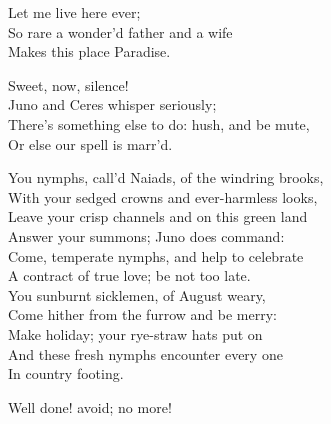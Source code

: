 \begin{verse_speech}[Ferdinand] 
Let me live here ever;\\
So rare a wonder'd father and a wife\\
Makes this place Paradise.
\end{verse_speech}


\begin{verse_speech}[Prospero] 
Sweet, now, silence!\\
Juno and Ceres whisper seriously;\\
There's something else to do: hush, and be mute,\\
Or else our spell is marr'd.
\end{verse_speech}

\begin{verse_speech}[Iris] 
You nymphs, call'd Naiads, of the windring brooks,\\
With your sedged crowns and ever-harmless looks,\\
Leave your crisp channels and on this green land\\
Answer your summons; Juno does command:\\
Come, temperate nymphs, and help to celebrate\\
A contract of true love; be not too late.\\
You sunburnt sicklemen, of August weary,\\
Come hither from the furrow and be merry:\\
Make holiday; your rye-straw hats put on\\
And these fresh nymphs encounter every one\\
In country footing.
\end{verse_speech}


\begin{verse_speech}[Prospero] 
Well done! avoid; no more!
\end{verse_speech}

